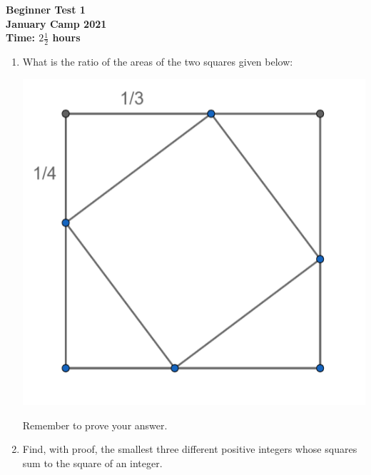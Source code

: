 \usepackage{mathtools,amsfonts}
\usepackage{enumerate}
\usepackage{fullpage}
\usepackage{array}


\thispagestyle{empty}

\begin{center}
  \textbf{\Large Beginner Test 1}
  \\ \vspace{1em}
  \textbf{\large January Camp 2021}
  \\ \vspace{1em}
  \textbf{\large Time: $2\frac{1}{2}$ hours}
\end{center}

\vspace{24pt}

\begin{enumerate}[1.]


\item What is the ratio of the areas of the two squares given below:
	\begin{center}
	\includegraphics[scale=0.4]{beginner_test_1_img_2.png}	
	\end{center}
Remember to prove your answer.\\


\item Find, with proof, the smallest three different positive integers whose squares sum to the square of an integer. %



\end{enumerate}

